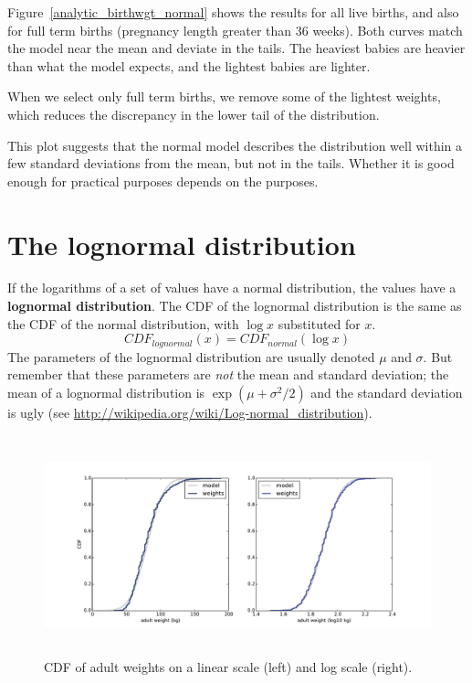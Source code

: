 \documentclass[12pt]{book}
\begin{document}
Figure~\ref{analytic_birthwgt_normal} shows the results for
all live births, and also for full term births (pregnancy length greater
than 36 weeks).  Both curves match the model near the mean and
deviate in the tails.  The heaviest babies are heavier than what
the model expects, and the lightest babies are lighter.

When we select only full term births, we remove some of the lightest
weights, which reduces the discrepancy in the lower tail of the
distribution.

This plot suggests that the normal model describes the distribution
well within a few standard deviations from the mean, but not in the
tails.  Whether it is good enough for practical purposes depends
on the purposes.


\section{The lognormal distribution}
\label{brfss}
\label{lognormal}

If the logarithms of a set of values have a normal distribution, the
values have a {\bf lognormal distribution}.  The CDF of the lognormal
distribution is the same as the CDF of the normal distribution,
with $\log x$ substituted for $x$.
%
\[ CDF_{lognormal}(x) = CDF_{normal}(\log x)\]
%
The parameters of the lognormal distribution are usually denoted
$\mu$ and $\sigma$.  But remember that these parameters are {\em not\/}
the mean and standard deviation; the mean of a lognormal distribution
is $\exp(\mu +\sigma^2/2)$ and the standard deviation is
ugly (see \url{http://wikipedia.org/wiki/Log-normal_distribution}).
  

\begin{figure}
\centerline{
\includegraphics[height=2.5in]{figs/brfss_weight.pdf}}
\caption{CDF of adult weights on a linear scale (left) and
log scale (right).}
\label{brfss_weight}
\end{figure}
\end{document}
